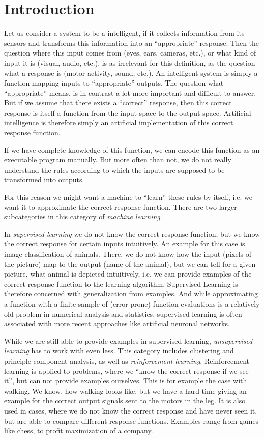 
\chapter{Introduction}
    Let us consider a system to be a intelligent, if it collects information from its sensors and transforms this information into an ``appropriate'' response. Then the question where this input comes from (eyes, ears, cameras, etc.), or what kind of input it is (visual, audio, etc.), is as irrelevant for this definition, as the question what a response is (motor activity, sound, etc.). An intelligent system is simply a function mapping inputs to ``appropriate'' outputs.  The question what ``appropriate'' means, is in contrast a lot more important and difficult to answer. But if we assume that there exists a ``correct'' response, then this correct response is itself a function from the input space to the output space. Artificial intelligence is therefore simply an artificial implementation of this correct response function. 

    If we have complete knowledge of this function, we can encode this function as an executable program manually. But more often than not, we do not really understand the rules according to which the inputs are supposed to be transformed into outputs. 

    For this reason we might want a machine to ``learn'' these rules by itself, i.e. we want it to approximate the correct response function. There are two larger subcategories in this category of \emph{machine learning}. 
    
    In \emph{supervised learning} we do not know the correct response function, but we know the correct response for certain inputs intuitively. An example for this case is image classification of animals. There, we do not know how the input (pixels of the picture) map to the output (name of the animal), but we can tell for a given picture, what animal is depicted intuitively, i.e. we can provide examples of the correct response function to the learning algorithm. Supervised Learning is therefore concerned with generalization from examples. And while approximating a function with a finite sample of (error prone) function evaluations is a relatively old problem in numerical analysis and statistics, supervised learning is often associated with more recent approaches like artificial neuronal networks. 

    While we are still able to provide examples in supervised learning, \emph{unsupervised learning} has to work with even less. This category includes clustering and principle component analysis, as well as \emph{reinforcement learning}. Reinforcement learning is applied to problems, where we ``know the correct response if we see it'', but can not provide examples ourselves. This is for example the case with walking. We know, how walking looks like, but we have a hard time giving an example for the correct output signals sent to the motors in the leg. It is also used in cases, where we do not know the correct response and have never seen it, but are able to compare different response functions. Examples range from games like chess, to profit maximization of a company. 

